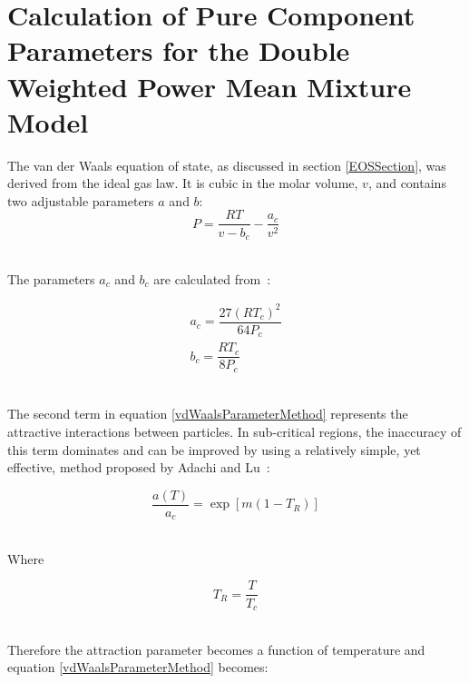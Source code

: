 
\section{Calculation of Pure Component Parameters for the Double Weighted Power Mean Mixture Model}\label{PureComponentParameterCalcSection}
			
The van der Waals equation of state, as discussed in section \ref{EOSSection}, was derived from the ideal gas law. It is cubic in the molar volume, $v$, and contains two adjustable parameters $a$ and $b$:\\

\begin{equation}
P  = \dfrac{RT}{v - b_{c}} - \dfrac{a_{c}}{v^{2}} \label{vdWaalsParameterMethod}
\end{equation}\

The parameters $a_{c}$ and $b_{c}$ are calculated from~\cite{ThermophysicalProperties}:\

\begin{eqnarray}
a_{c} = \dfrac{27 \left( RT_{c} \right) ^{2}}{64P_{c}} \label{acParameterMethod}\\
b_{c} = \dfrac{ RT_{c}}{8P_{c}} \label{bcParameterMethod}\
\end{eqnarray}\

The second term in equation \ref{vdWaalsParameterMethod} represents the attractive interactions between particles. In sub-critical regions, the inaccuracy of this term dominates and can be improved by using a relatively simple, yet effective, method proposed by Adachi and Lu~\cite{Adachi-Lu}:\

\begin{equation}
\dfrac{a\left(T\right)}{a_{c}}= \exp \left[m\left(1-T_{R}\right)\right] \label{aTParameterMethod}
\end{equation}\

Where\

\begin{equation}
T_{R} = \dfrac{T}{T_{c}}
\end{equation}\

Therefore the attraction parameter becomes a function of temperature and equation \ref{vdWaalsParameterMethod} becomes:\


